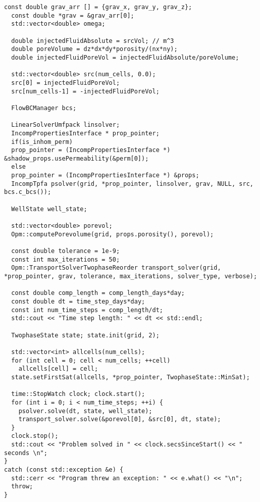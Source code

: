 \begin{lstlisting}[caption={The C++ program used to run the 2D numerical tests in Chapter \ref{chapter:numerical_results}},label={listing:test_driver_2D}]
  const double grav_arr [] = {grav_x, grav_y, grav_z};
  const double *grav = &grav_arr[0];
  std::vector<double> omega;

  double injectedFluidAbsolute = srcVol; // m^3
  double poreVolume = dz*dx*dy*porosity/(nx*ny);
  double injectedFluidPoreVol = injectedFluidAbsolute/poreVolume;
  
  std::vector<double> src(num_cells, 0.0);
  src[0] = injectedFluidPoreVol; 
  src[num_cells-1] = -injectedFluidPoreVol;

  FlowBCManager bcs;

  LinearSolverUmfpack linsolver;
  IncompPropertiesInterface * prop_pointer;
  if(is_inhom_perm)
  prop_pointer = (IncompPropertiesInterface *) &shadow_props.usePermeability(&perm[0]);
  else
  prop_pointer = (IncompPropertiesInterface *) &props;
  IncompTpfa psolver(grid, *prop_pointer, linsolver, grav, NULL, src, bcs.c_bcs());
  
  WellState well_state;
  
  std::vector<double> porevol;
  Opm::computePorevolume(grid, props.porosity(), porevol);
  
  const double tolerance = 1e-9;
  const int max_iterations = 50;
  Opm::TransportSolverTwophaseReorder transport_solver(grid, *prop_pointer, grav, tolerance, max_iterations, solver_type, verbose);

  const double comp_length = comp_length_days*day;
  const double dt = time_step_days*day;
  const int num_time_steps = comp_length/dt;
  std::cout << "Time step length: " << dt << std::endl;
  
  TwophaseState state; state.init(grid, 2);
  
  std::vector<int> allcells(num_cells);
  for (int cell = 0; cell < num_cells; ++cell)
    allcells[cell] = cell;
  state.setFirstSat(allcells, *prop_pointer, TwophaseState::MinSat);

  time::StopWatch clock; clock.start();
  for (int i = 0; i < num_time_steps; ++i) {
    psolver.solve(dt, state, well_state);
    transport_solver.solve(&porevol[0], &src[0], dt, state);
  }
  clock.stop();
  std::cout << "Problem solved in " << clock.secsSinceStart() << " seconds \n";
}
catch (const std::exception &e) {
  std::cerr << "Program threw an exception: " << e.what() << "\n";
  throw;
}
\end{lstlisting}
\newpage
